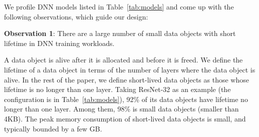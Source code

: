 We profile DNN models listed in Table~\ref{tab:models} \textcolor{check}{and come up with the following observations, which guide our design: }

\textbf{Observation 1}: There are a large number of small data objects with short lifetime in DNN training workloads.

\textcolor{check}{
A data object is alive after it is allocated and before it is freed. We define the lifetime of a data object in terms of the number of layers where the data object is alive. In the rest of the paper, we define short-lived data objects as those whose lifetime is no longer than one layer. Taking ResNet-32 as an example (the configuration is in Table~\ref{tab:models}), 92\% of its data objects have lifetime no longer than one layer. Among them, 98\% is small data objects (smaller than 4KB). The peak memory consumption of short-lived data objects is small, and typically bounded by a few GB.}



